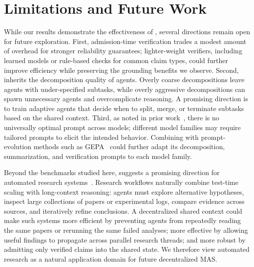 \vspace{-2mm}
\section{Limitations and Future Work}\label{sec:limit}
\vspace{-1mm}
While our results demonstrate the effectiveness of \toolName{}, several directions remain open for future exploration. First, admission-time verification trades a modest amount of overhead for stronger reliability guarantees; lighter-weight verifiers, including learned models or rule-based checks for common claim types, could further improve efficiency while preserving the grounding benefits we observe. Second, \toolName{} inherits the decomposition quality of agents. Overly coarse decompositions leave agents with under-specified subtasks, while overly aggressive decompositions can spawn unnecessary agents and overcomplicate reasoning. A promising direction is to train adaptive agents that decide when to split, merge, or terminate subtasks based on the shared context. Third, as noted in prior work~\citep{zhang2025recursive}, there is no universally optimal prompt across models; different model families may require tailored prompts to elicit the intended behavior. Combining \toolName{} with prompt-evolution methods such as GEPA~\citep{agrawal2025gepa} could further adapt its decomposition, summarization, and verification prompts to each model family.

Beyond the benchmarks studied here, \toolName{} suggests a promising direction for automated research systems~\citep{alphaevolve2025, liu2026skydiscover}. Research workflows naturally combine test-time scaling with long-context reasoning: agents must explore alternative hypotheses, inspect large collections of papers or experimental logs, compare evidence across sources, and iteratively refine conclusions. A decentralized shared context could make such systems more efficient by preventing agents from repeatedly reading the same papers or rerunning the same failed analyses; more effective by allowing useful findings to propagate across parallel research threads; and more robust by admitting only verified claims into the shared state. We therefore view automated research as a natural application domain for future decentralized MAS.

\vspace{-2mm}
